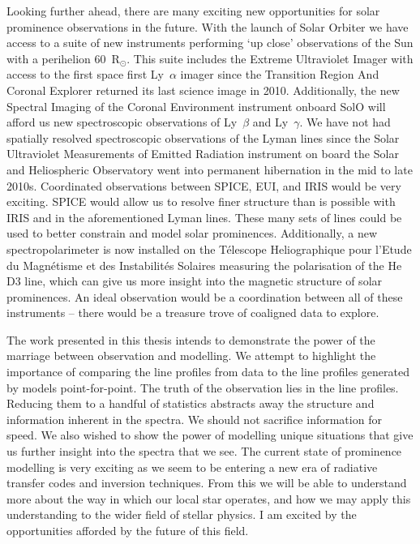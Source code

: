Looking further ahead, there are many exciting new opportunities for solar prominence observations in the future. With the launch of Solar Orbiter \citep[SolO; ][]{muller_solar_2020} we have access to a suite of new instruments performing `up close' observations of the Sun with a perihelion 60~R$_\odot$. This suite includes the Extreme Ultraviolet Imager \citep[EUI; ][]{rochus_solar_2020} with access to the first space first Ly~$\alpha$ imager since the Transition Region And Coronal Explorer \citep[TRACE; ][]{handy_transition_1999} returned its last science image in 2010. Additionally, the new Spectral Imaging of the Coronal Environment \citep[SPICE; ][]{spice_consortium_solar_2020} instrument onboard SolO will afford us new spectroscopic observations of Ly~$\beta$ and Ly~$\gamma$. We have not had spatially resolved spectroscopic observations of the Lyman lines since the Solar Ultraviolet Measurements of Emitted Radiation \citep[SUMER; ][]{wilhelm_sumer_1995} instrument on board the Solar and Heliospheric Observatory \citep[SOHO; ][]{domingo_soho_1995} went into permanent hibernation in the mid to late 2010s. Coordinated observations between SPICE, EUI, and IRIS would be very exciting. SPICE would allow us to resolve finer structure than is possible with IRIS and in the aforementioned Lyman lines. These many sets of lines could be used to better constrain and model solar prominences. Additionally, a new spectropolarimeter is now installed on the T\'{e}lescope Heliographique pour l'Etude du Magn\'{e}tisme et des Instabilit\'{e}s Solaires \citep[Heliographic Telescope for the Study of Solar Magnetism and Instabilities; THEMIS; ][]{mein_themis_1985} measuring the polarisation of the He D3 line, which can give us more insight into the magnetic structure of solar prominences. An ideal observation would be a coordination between all of these instruments -- there would be a treasure trove of coaligned data to explore.


The work presented in this thesis intends to demonstrate the power of the marriage between observation and modelling. We attempt to highlight the importance of comparing the line profiles from data to the line profiles generated by models point-for-point. The truth of the observation lies in the line profiles. Reducing them to a handful of statistics abstracts away the structure and information inherent in the spectra. We should not sacrifice information for speed. We also wished to show the power of modelling unique situations that give us further insight into the spectra that we see. The current state of prominence modelling is very exciting as we seem to be entering a new era of radiative transfer codes and inversion techniques. From this we will be able to understand more about the way in which our local star operates, and how we may apply this understanding to the wider field of stellar physics. I am excited by the opportunities afforded by the future of this field.